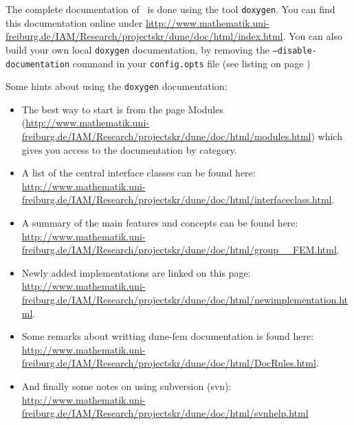 The complete documentation of \Fem\ is done using the tool \texttt{doxygen}.
You can find this documentation online under \url{http://www.mathematik.uni-freiburg.de/IAM/Research/projectskr/dune/doc/html/index.html}.
You can also build your own local \texttt{doxygen} documentation, by removing the \texttt{--disable-documentation} command in your \texttt{config.opts} file (see listing on page \pageref{config.opts})

Some hints about using the \texttt{doxygen} documentation:
\begin{itemize}
\item The best way to start is from the page Modules (\url{http://www.mathematik.uni-freiburg.de/IAM/Research/projectskr/dune/doc/html/modules.html}) which gives you access to the documentation by category.

\item A list of the central interface classes can be found here: \url{http://www.mathematik.uni-freiburg.de/IAM/Research/projectskr/dune/doc/html/interfaceclass.html}.

\item A summary of the main features and concepts can be found here: \url{http://www.mathematik.uni-freiburg.de/IAM/Research/projectskr/dune/doc/html/group__FEM.html}.

\item Newly added implementations are linked on this page: \url{http://www.mathematik.uni-freiburg.de/IAM/Research/projectskr/dune/doc/html/newimplementation.html}.

\item Some remarks about writting dune-fem documentation is found here: \url{http://www.mathematik.uni-freiburg.de/IAM/Research/projectskr/dune/doc/html/DocRules.html}.

\item And finally some notes on using subversion (svn):
\url{http://www.mathematik.uni-freiburg.de/IAM/Research/projectskr/dune/doc/html/svnhelp.html}
\end{itemize}
